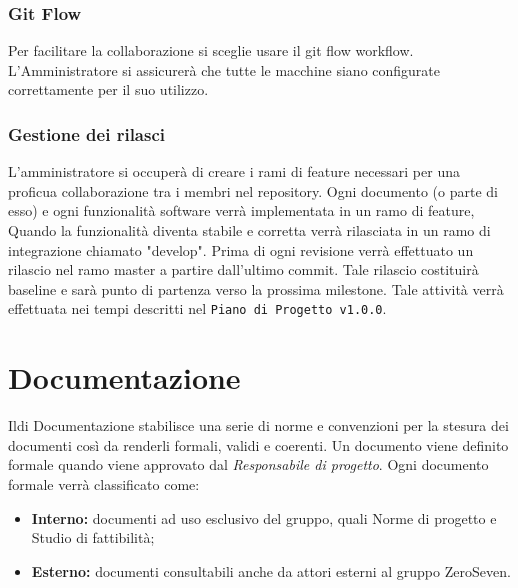 \subsubsection{Git Flow}
Per facilitare la collaborazione si sceglie usare il git flow workflow. L'Amministratore si assicurerà che tutte le macchine siano configurate correttamente per il suo utilizzo.
\subsubsection{Gestione dei rilasci}
L'amministratore si occuperà di creare i rami di feature necessari per una proficua collaborazione tra i membri nel repository. Ogni documento (o parte di esso) e ogni funzionalità software verrà implementata in un ramo di feature, Quando la funzionalità diventa stabile e corretta verrà rilasciata in un ramo di integrazione chiamato "develop". Prima di ogni revisione verrà effettuato un rilascio nel ramo master a partire dall'ultimo commit. Tale rilascio costituirà baseline e sarà punto di partenza verso la prossima milestone. Tale attività verrà effettuata nei tempi descritti nel \texttt{Piano di Progetto v1.0.0}. 


\section{Documentazione}
Ildi Documentazione stabilisce una serie di norme e convenzioni per la stesura dei documenti così da renderli formali, validi e coerenti.
Un documento viene definito formale quando viene approvato dal \textit{Responsabile di progetto}.
Ogni documento formale verrà classificato come:
\begin{itemize}
	\item \textbf{Interno:} documenti ad uso esclusivo del gruppo, quali Norme di progetto e Studio di fattibilità;
	\item \textbf{Esterno:} documenti consultabili anche da attori esterni al gruppo ZeroSeven.
	
\end{itemize}

